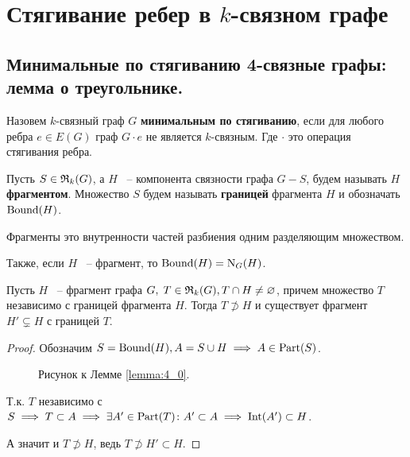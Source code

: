 \newpage


\section{Стягивание ребер в $k$-связном графе}

\subsection{Минимальные по стягиванию 4-связные графы: лемма о треугольнике.}

\begin{df*}
	Назовем $k$-связный граф $G$ \textbf{минимальным по стягиванию}, если для любого ребра $e \in E(G)$ граф $G \cdot e$ не является  $k$-связным. Где  $\cdot$ это операция стягивания ребра.
\end{df*}

\begin{df*}
	Пусть $S \in \mathfrak{R}_k(G)$, а $H$ ~-- компонента связности графа $G - S$, будем называть $H$ \textbf{фрагментом}.
	Множество $S$ будем называть \textbf{границей} фрагмента $H$ и обозначать $\operatorname{Bound}(H)$.
\end{df*}

\begin{remrk*}
	Фрагменты это внутренности частей разбиения одним разделяющим множеством.

	Также, если $H$ ~-- фрагмент, то $\operatorname{Bound}(H) = \operatorname{N}_G(H)$.
\end{remrk*}

\begin{customlm}{4.0} \label{lemma:4_0}
	Пусть $H$ ~-- фрагмент графа $G, \; T \in \mathfrak{R}_k(G), T \cap H \neq \varnothing$, причем множество  $T$ независимо с границей фрагмента $H$. Тогда $T \not \supset H$ и существует фрагмент $H' \subsetneq H$ с границей $T$.
\end{customlm}

\begin{proof}
	Обозначим $S = \operatorname{Bound}(H), A = S \cup H \implies A \in \operatorname{Part}(S)$.

\begin{figure}[ht]
    \centering
	\caption{Рисунок к Лемме \ref{lemma:4_0}.}
    \label{fig:lemma_4_0}
\end{figure}

	Т.к. $T$ независимо с  $S \implies T \subset A \implies \exists A' \in \operatorname{Part}(T) \colon A' \subset A \implies \operatorname{Int}(A') \subset H$.

	А значит и $T \not \supset H$, ведь  $T \not \supset H' \subset H$.
\end{proof}

